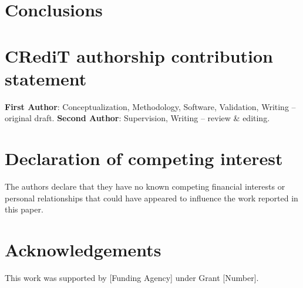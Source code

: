 \documentclass[review]{elsarticle}
\begin{document}
\section{Conclusions}
\label{sec:conclusions}


\section*{CRediT authorship contribution statement}
\textbf{First Author}: Conceptualization, Methodology, Software, Validation, Writing -- original draft. \textbf{Second Author}: Supervision, Writing -- review \& editing.

\section*{Declaration of competing interest}
The authors declare that they have no known competing financial interests or personal relationships that could have appeared to influence the work reported in this paper.

\section*{Acknowledgements}
This work was supported by [Funding Agency] under Grant [Number].



\end{document}

